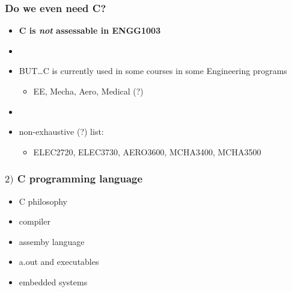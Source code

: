 \documentclass[english,14pt]{beamer}
\begin{document}

\begin{frame}[fragile]

\frametitle{Do we even need C?}

\begin{itemize}
	\item \textbf{C is \emph{not} assessable in ENGG1003}
	
	\item[]
	
	\item BUT\ldots C is currently used in some courses in some Engineering programs
	\begin{itemize}
		\item EE, Mecha, Aero, Medical (?)
	\end{itemize}
	
	\item[]
	\item non-exhaustive (?) list:
	\begin{itemize}
		\item[] ELEC2720, ELEC3730, AERO3600, MCHA3400, MCHA3500
	\end{itemize}

\end{itemize}
\end{frame}


\begin{frame}[fragile]

\frametitle{$2)$ C programming language}

\begin{itemize}
	\item C philosophy
	\item compiler
	\item assemby language
	\item a.out and executables
	\item embedded systems
\end{itemize}

\end{frame}

\end{document}
